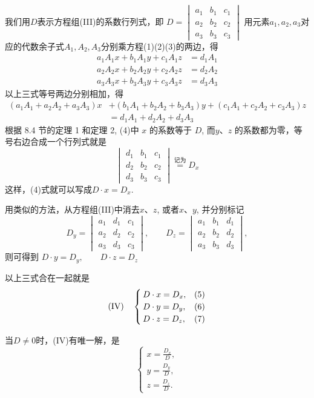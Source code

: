 我们用$D$表示方程组(III)的系数行列式，即
$D=\begin{vmatrix}a_1&b_1&c_1\\a_2&b_2&c_2\\a_3&b_3&c_3\end{vmatrix}$
用元素$a_1,a_2,a_3$对应的代数余子式$A_1,A_2,A_3$分别乘方程(1)(2)(3)的两边，得
\[\begin{split}
  a_1A_1x+b_1A_1y+c_1A_1z&=d_1A_1\\
a_2A_2x+b_2A_2y+c_2A_2z&=d_2A_2\\
a_3A_3x+b_3A_3y+c_3A_3z&=d_3A_3
\end{split}\]
以上三式等号两边分别相加，得
\begin{equation}
  \begin{split}
(a_1A_1+a_2A_2+a_3A_3)x&+(b_1A_1+b_2A_2+b_3A_3)y
+(c_1A_1+c_2A_2+c_3A_3)z\\
&    =d_1A_1+d_2A_2+d_3A_3
  \end{split}\tag{4}
\end{equation}
根据 8.4 节的定理 1 和定理 2, (4)中 $x$ 的系数等于 $D$, 而$y$、$z$
的系数都为零，等号右边合成一个行列式就是
$$\begin{vmatrix}d_1&b_1&c_1\\d_2&b_2&c_2\\d_3&b_3&c_3\end{vmatrix}\overset{\text{记为}}{\operatorname*{=}}D_x$$
这样，(4)式就可以写成$D\cdot x=D_x$.

用类似的方法，从方程组(III)中消去$x$、$z$, 或者$x$、$y$, 并分别标记
$$D_y=\begin{vmatrix}a_1&d_1&c_1\\a_2&d_2&c_2\\a_3&d_3&c_3\end{vmatrix},\qquad D_z=\begin{vmatrix}a_1&b_1&d_1\\a_2&b_2&d_2\\a_3&b_3&d_3\end{vmatrix},$$
则可得到
$D\cdot y=D_{y},\qquad D\cdot z=D_{z}$

以上三式合在一起就是
$$({\rm  IV})\quad \begin{cases}D\cdot  x=D_x,&(5)\\D\cdot y=D_y,&(6)\\D\cdot  z=D_z,&(7)\end{cases}$$

当$D\neq0$时，(IV)有唯一解，是
\begin{equation}
  \begin{cases}x=\frac{D_x}{D},\\[1ex] y=\frac{D_y}{D},\\[1ex] z=\frac{D_z}{D}.\end{cases}\tag{8}
\end{equation}


